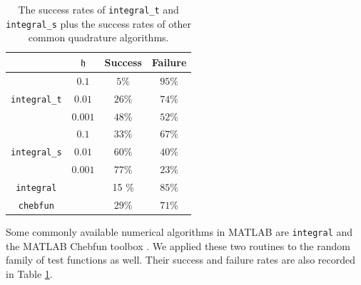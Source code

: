 \documentclass{iitthesis}
\theoremstyle{definition}
\theoremstyle{remark}
\begin{document}
\begin{table}[ht]
\caption{The success rates of {\tt integral\_t} and {\tt integral\_s} plus the success rates of other common quadrature algorithms.}
\centering
\begin{tabular}{cccc}
\hline\hline
& $\mathfrak{h}$ & Success & Failure \\
\hline
&$0.1$  & $5\%$ &  $95\%$  \\
{\tt integral\_t}
 &$0.01$  & $26\%$ & $74\%$ \\
&$0.001$ & $48\%$ &$52\%$ \\
\hline
&$0.1$  & $33\%$ &  $67\%$  \\
{\tt integral\_s}
 &$0.01$  & $60\%$ & $40\%$ \\
&$0.001$ & $77\%$ &$23\%$ \\
\hline
{\tt integral} & & 15 \% & $85\%$\\
{\tt chebfun} & &29\% & $71\%$\\
\hline
\end{tabular}
\label{integresultstable}
\end{table}

Some commonly available numerical algorithms in MATLAB are {\tt integral} \cite{MAT8.1} and the MATLAB Chebfun toolbox \cite{TrefEtal12}. We applied these two routines to the random family of test functions as well.  Their success and failure rates are also recorded in Table \ref{integresultstable}.  %
\end{document}
